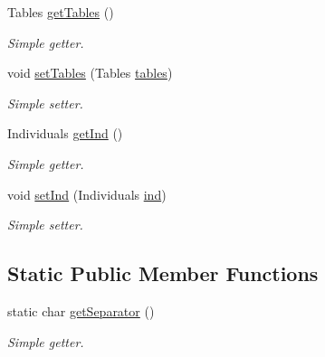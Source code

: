 \begin{DoxyCompactItemize}
Tables \hyperlink{class_ontology_1_1_ontology_a4c4235bf4ca9017abfcca1bc004831aa}{getTables} ()
\begin{DoxyCompactList}\small\item\em Simple getter. \end{DoxyCompactList}\item 
void \hyperlink{class_ontology_1_1_ontology_a3fbb5f03b9feb3b984c72be7e48e7830}{setTables} (Tables \hyperlink{class_ontology_1_1_ontology_abf6ad8e362e7c57b8fad20f688765dac}{tables})
\begin{DoxyCompactList}\small\item\em Simple setter. \end{DoxyCompactList}\item 
Individuals \hyperlink{class_ontology_1_1_ontology_a48a2d9c2ab89d1039f508c7deaee5b19}{getInd} ()
\begin{DoxyCompactList}\small\item\em Simple getter. \end{DoxyCompactList}\item 
void \hyperlink{class_ontology_1_1_ontology_ae4544b6a354a59abc8d92b5ed77365ef}{setInd} (Individuals \hyperlink{class_ontology_1_1_ontology_af8d92920b83a12fa85e86c9b8b606c2e}{ind})
\begin{DoxyCompactList}\small\item\em Simple setter. \end{DoxyCompactList}\end{DoxyCompactItemize}
\subsection*{Static Public Member Functions}
\begin{DoxyCompactItemize}
\item 
static char \hyperlink{class_ontology_1_1_ontology_adffaab20a43bbfbac43402980e47076a}{getSeparator} ()
\begin{DoxyCompactList}\small\item\em Simple getter. \end{DoxyCompactList}\end{DoxyCompactItemize}

